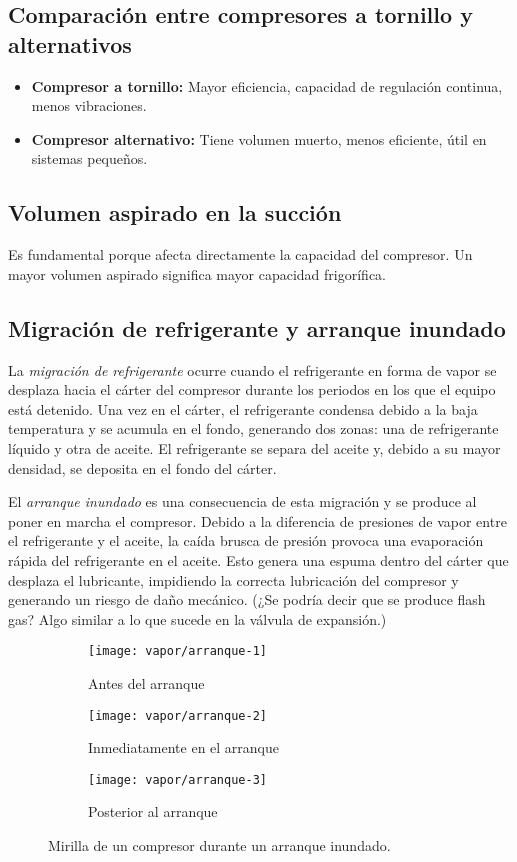 \subsection{Comparación entre compresores a tornillo y alternativos}
\begin{itemize}
\item \textbf{Compresor a tornillo:} Mayor eficiencia, capacidad de regulación continua, menos vibraciones.
\item \textbf{Compresor alternativo:} Tiene volumen muerto, menos eficiente, útil en sistemas pequeños.
\end{itemize}

\subsection{Volumen aspirado en la succión}
Es fundamental porque afecta directamente la capacidad del compresor. Un mayor volumen aspirado significa mayor capacidad frigorífica.

\subsection{Migración de refrigerante y arranque inundado}

La \emph{migración de refrigerante} ocurre cuando el refrigerante en forma de vapor se desplaza hacia el cárter del compresor durante los periodos en los que el equipo está detenido. Una vez en el cárter, el refrigerante condensa debido a la baja temperatura y se acumula en el fondo, generando dos zonas: una de refrigerante líquido y otra de aceite. El refrigerante se separa  del aceite y, debido a su mayor densidad, se deposita en el fondo del cárter.

El \emph{arranque inundado} es una consecuencia de esta migración y se produce al poner en marcha el compresor. Debido a la diferencia de presiones de vapor entre el refrigerante y el aceite, la caída brusca de presión provoca una evaporación rápida del refrigerante en el aceite. Esto genera una espuma dentro del cárter que desplaza el lubricante, impidiendo la correcta lubricación del compresor y generando un riesgo de daño mecánico. (¿Se podría decir que se produce flash gas? Algo similar a lo que sucede en la válvula de expansión.)

\begin{figure}[h]
    \centering
    \begin{subfigure}{.3\linewidth}
    \centering
    \texttt{[image: vapor/arranque-1]}
    \caption{Antes del arranque}
    \end{subfigure}
    \begin{subfigure}{.3\linewidth}
    \centering
    \texttt{[image: vapor/arranque-2]}
    \caption{Inmediatamente en el arranque}
    \end{subfigure}
    \begin{subfigure}{.3\linewidth}
    \centering
    \texttt{[image: vapor/arranque-3]}
    \caption{Posterior al arranque}
    \end{subfigure}
    \caption{Mirilla de un compresor durante un arranque inundado.}
\end{figure}


